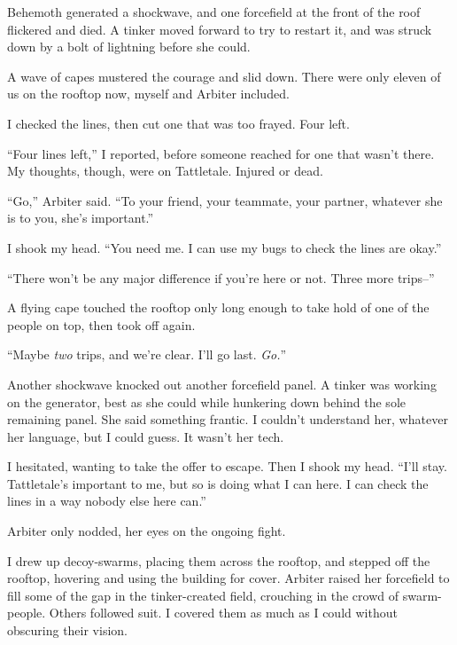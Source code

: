 Behemoth generated a shockwave, and one forcefield at the front of the roof flickered and died.  A tinker moved forward to try to restart it, and was struck down by a bolt of lightning before she could.



A wave of capes mustered the courage and slid down.  There were only eleven of us on the rooftop now, myself and Arbiter included.



I checked the lines, then cut one that was too frayed.  Four left.



``Four lines left,'' I reported, before someone reached for one that wasn't there.  My thoughts, though, were on Tattletale.  Injured or dead.



``Go,'' Arbiter said.  ``To your friend, your teammate, your partner, whatever she is to you, she's important.''



I shook my head.  ``You need me.  I can use my bugs to check the lines are okay.''



``There won't be any major difference if you're here or not.  Three more trips--''



A flying cape touched the rooftop only long enough to take hold of one of the people on top, then took off again.



``Maybe \emph{two }trips, and we're clear.  I'll go last.  \emph{Go}\emph{.}''



Another shockwave knocked out another forcefield panel.  A tinker was working on the generator, best as she could while hunkering down behind the sole remaining panel.  She said something frantic.  I couldn't understand her, whatever her language, but I could guess.  It wasn't her tech.



I hesitated, wanting to take the offer to escape.  Then I shook my head.  ``I'll stay.  Tattletale's important to me, but so is doing what I can here.  I can check the lines in a way nobody else here can.''



Arbiter only nodded, her eyes on the ongoing fight.



I drew up decoy-swarms, placing them across the rooftop, and stepped off the rooftop, hovering and using the building for cover.  Arbiter raised her forcefield to fill some of the gap in the tinker-created field, crouching in the crowd of swarm-people.  Others followed suit.  I covered them as much as I could without obscuring their vision.



